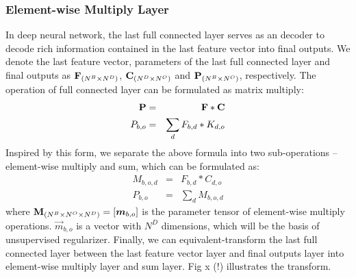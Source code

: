 \documentclass[runningheads]{llncs}
\begin{document}
\subsubsection{Element-wise Multiply Layer}
\label{section:Element-wise Multiply Layer}
In deep neural network, the last full connected layer serves as an decoder to decode rich information contained in the last feature vector into final outputs. We denote the last feature vector, parameters of the last full connected layer and final outputs as ${\bf F}_{(N^{B}\times N^{D})}$, ${\bf C}_{(N^{D}\times N^{O})}$ and ${\bf P}_{(N^{B}\times N^{O})}$, respectively. The operation of full connected layer can be formulated as matrix multiply:
\begin{eqnarray}
  {\bf P} &=& {\bf F}*{\bf C} \\
  P_{b,o} &=&  \sum_{d}{F_{b,d}*K_{d,o}}
\end{eqnarray}
Inspired by this form, we separate the above formula into two sub-operations -- element-wise multiply and sum, which can be formulated as:
\begin{eqnarray}
  M_{b,o,d} &=& F_{b,d} * C_{d,o} \\
  P_{b,o} &=& \sum_{d}{M_{b,o,d}}
\end{eqnarray}
where ${\bf M}_{(N^{B}\times N^{O}\times N^{D})} = [\vec{m}_{b,o}]$ is the parameter tensor of element-wise multiply operations. $\vec{m}_{b,o}$ is a vector with $N^{D}$ dimensions, which will be the basis of unsupervised regularizer. Finally, we can equivalent-transform the last full connected layer between the last feature vector layer and final outputs layer into element-wise multiply layer and sum layer. Fig x (!) illustrates the transform.
\end{document}

